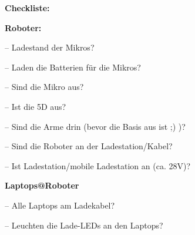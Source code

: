 \documentclass[a4paper]{scrartcl}
\let\oldmarginpar\marginpar
\renewcommand\marginpar[1]{\-\oldmarginpar[\raggedleft #1]%
{\raggedright #1}}
\newenvironment{checklist}{%
  \begin{list}{}{}%
  \let\olditem\item
  \renewcommand\item{\olditem -- \marginpar{$\Box$} }
  \newcommand\checkeditem{\olditem -- \marginpar{$\CheckedBox$} }
}{%
  \end{list}
}
\begin{document}
\begin{center}
\textbf{\Huge Checkliste:}\\
\end{center}
\textbf{Roboter:}
\begin{checklist}
	\item Ladestand der Mikros?
	\item Laden die Batterien f\"ur die Mikros?
	\item Sind die Mikro aus?
	\item Ist die 5D aus?
	\item Sind die Arme drin (bevor die Basis aus ist ;) )?
	\item Sind die Roboter an der Ladestation/Kabel?
	\item Ist Ladestation/mobile Ladestation an (ca. 28V)?
\end{checklist}
\textbf{Laptops@Roboter}
\begin{checklist}
	\item Alle Laptops am Ladekabel?
	\item Leuchten die Lade-LEDs an den Laptops?
\end{checklist}	
\end{document}
